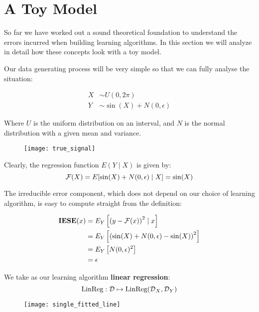 \section{A Toy Model}
%
%
\begin{frame}
  So far we have worked out a sound theoretical foundation to understand the
  errors incurred when building learning algorithms.  In this section we will
  analyze in detail how these concepts look with a toy model.
\end{frame}
%
%
\begin{frame}
  Our data generating process will be very simple so that we can fully analyse
  the situation:

  \begin{align*}
    X &\sim U(0, 2 \pi) \\
    Y &\sim \sin(X) + N(0, \epsilon)
  \end{align*}

  Where $U$ is the uniform distribution on an interval, and $N$ is the normal
  distribution with a given mean and variance.
\end{frame}
%
%
\begin{frame}
  \begin{figure}
    \texttt{[image: true\_signal]}
  \end{figure}

  Clearly, the regression function $E(Y \mid X)$ is given by:
  $$ \operatorname*{\mathcal{F}}(X) = E[ \sin(X) + N(0, \epsilon) \mid X ] = \sin(X) $$
\end{frame}
%
%
\begin{frame}
  The irreducible error component, which does not depend on our choice of
  learning algorithm, is easy to compute straight from the definition:

  \begin{align*}
      \operatorname*{\mathbf{IESE}}(x) &= E_Y \left[ \left( y - \operatorname*{\mathcal{F}}(x) \right)^2 \mid x \right] \\
      &= E_Y \left[ \left( \sin(X) + N(0, \epsilon) - \sin(X) \right)^2 \right] \\
      &= E_Y \left[ N(0, \epsilon)^2 \right] \\
      &= \epsilon
  \end{align*}
   
\end{frame}
%
%
\begin{frame}
  We take as our learning algorithm \textbf{linear regression}:
  $$ \operatorname*{\text{LinReg}}: \operatorname*{\mathcal{D}} \mapsto \operatorname*{\text{LinReg}}({\operatorname*{\mathcal{D}}}_{X}, {\operatorname*{\mathcal{D}}}_{Y}) $$
  \begin{figure}
    \texttt{[image: single\_fitted\_line]}
  \end{figure}
\end{frame}
